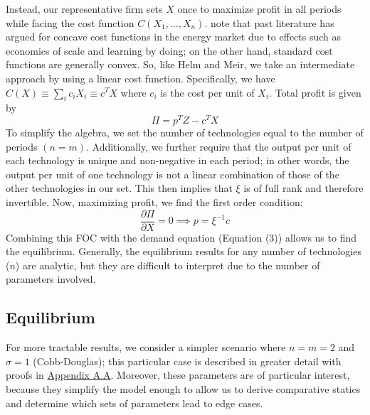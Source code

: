\documentclass[11pt,a4paper]{extarticle}
\begin{document}
Instead, our representative firm sets $X$ once to maximize profit in all periods while facing the cost function $C(X_1, \dots, X_n)$.  \citet{HH} note that past literature has argued for concave cost functions in the energy market due to effects such as economics of scale and learning by doing; on the other hand, standard cost functions are generally convex. So, like Helm and Meir, we take an intermediate approach by using a linear cost function. Specifically, we have $C(X) \equiv \sum_i c_i X_i \equiv c^T X$ where $c_i$ is the cost per unit of $X_i$. Total profit is given by 
\begin{equation}
\Pi = p^T Z - c^T X
\end{equation}
To simplify the algebra, we set the number of technologies equal to the number of periods $(n=m)$. Additionally, we further require that the output per unit of each technology is unique and non-negative in each period; in other words, the output per unit of one technology is not a linear combination of those of the other technologies in our set. This then implies that $\xi$ is of full rank and therefore invertible.  Now, maximizing profit, we find the first order condition:
\begin{equation}
\frac{\partial \Pi}{\partial X} = 0 \implies p = \xi^{-1} c
\end{equation}
Combining this FOC with the demand equation (Equation (3)) allows us to find the equilibrium. Generally, the equilibrium results for any number of technologies ($n$) are analytic, but they are difficult to interpret due to the number of parameters involved. 

\subsection{Equilibrium}

For more tractable results, we consider a simpler scenario where $n = m = 2$ and $\sigma = 1$ (Cobb-Douglas); this particular case is described in greater  detail with proofs in \hyperref[sec:cobbdoug]{Appendix A.A}. Moreover, these parameters are of particular interest, because they simplify the model enough to allow us to derive comparative statics and determine which sets of parameters lead to edge cases. 
\end{document}
